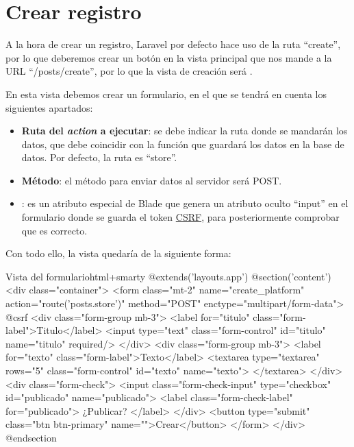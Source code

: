 \chapter{Crear registro}

A la hora de crear un registro, Laravel por defecto hace uso de la ruta “create”, por lo que deberemos crear un botón en la vista principal que nos mande a la URL “/posts/create”, por lo que la vista de creación será .

En esta vista debemos crear un formulario, en el que se tendrá en cuenta los siguientes apartados:

\begin{itemize}
    \item \textbf{Ruta del \textit{action} a ejecutar}: se debe indicar la ruta donde se mandarán los datos, que debe coincidir con la función que guardará los datos en la base de datos. Por defecto, la ruta es “store”.
    \item \textbf{Método}: el método para enviar datos al servidor será POST.
    \item {}: es un atributo especial de Blade que genera un atributo oculto “input” en el formulario donde se guarda el token \href{https://es.wikipedia.org/wiki/Cross-site_request_forgery}{CSRF}, para posteriormente comprobar que es correcto.
\end{itemize}

Con todo ello, la vista quedaría de la siguiente forma:

\begin{mycode}{Vista del formulario}{html+smarty}{{\footnotesize }}
@extends('layouts.app')
@section('content')
  <div class="container">
    <form class="mt-2" name="create_platform"
       action="{{route('posts.store')}}" method="POST" enctype="multipart/form-data">
      @csrf
      <div class="form-group mb-3">
        <label for="titulo" class="form-label">Titulo</label>
        <input type="text" class="form-control" id="titulo" name="titulo" required/>
      </div>
      <div class="form-group mb-3">
        <label for="texto" class="form-label">Texto</label>
        <textarea type="textarea" rows="5" class="form-control" id="texto" name="texto">
        </textarea>
      </div>
      <div class="form-check">
        <input class="form-check-input" type="checkbox" id="publicado"
          name="publicado">
        <label class="form-check-label" for="publicado">
        ¿Publicar?
      </label>
      </div>
      <button type="submit" class="btn btn-primary" name="">Crear</button>
    </form>
  </div>
@endsection
\end{mycode}

